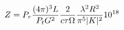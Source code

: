 \documentclass[preview]{standalone}
\begin{document}
\begin{align*}
\special{dvisvgm:raw <g id='unique000'>}Z = P_r \frac{(4 \pi)^3 L}{P_t G^2} \frac{2}{c \tau \Omega} \frac{\lambda^2 R^2}{\pi^5 |K|^2} 10^{18}\special{dvisvgm:raw </g>}
\end{align*}
\end{document}
